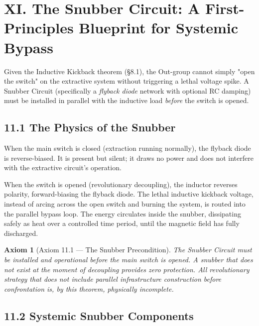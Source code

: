 \documentclass[12pt]{book}
\numberwithin{equation}{chapter}
\newtheorem{axiom}{Axiom}[chapter]
\begin{document}
\section{XI. The Snubber Circuit: A First-Principles Blueprint for Systemic Bypass}

    Given the Inductive Kickback theorem (§8.1), the Out-group cannot simply "open the switch" on the extractive system without triggering a lethal voltage spike. A Snubber Circuit (specifically a \emph{flyback diode} network with optional RC damping) must be installed in parallel with the inductive load \emph{before} the switch is opened.
  

\subsection{11.1 The Physics of the Snubber}

    When the main switch is closed (extraction running normally), the flyback diode is reverse-biased. It is present but silent; it draws no power and does not interfere with the extractive circuit's operation.
  

    When the switch is opened (revolutionary decoupling), the inductor reverses polarity, forward-biasing the flyback diode. The lethal inductive kickback voltage, instead of arcing across the open switch and burning the system, is routed into the parallel bypass loop. The energy circulates inside the snubber, dissipating safely as heat over a controlled time period, until the magnetic field has fully discharged.
  

\begin{axiom}[Axiom 11.1 — The Snubber Precondition]
The Snubber Circuit must be installed and operational \emph{before} the main switch is opened. A snubber that does not exist at the moment of decoupling provides zero protection. All revolutionary strategy that does not include parallel infrastructure construction before confrontation is, by this theorem, physically incomplete.
  \end{axiom}

\subsection{11.2 Systemic Snubber Components}
\end{document}
